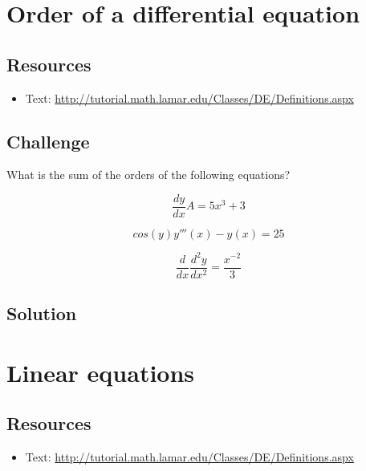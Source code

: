 \section{Order of a differential equation}

\subsection*{Resources}
\begin{itemize}
    \item Text: \url{http://tutorial.math.lamar.edu/Classes/DE/Definitions.aspx}
\end{itemize}

\subsection*{Challenge}
What is the sum of the orders of the following equations?

\begin{equation}
    \frac{dy}{dx}A = 5x^3 + 3
\end{equation}

\begin{equation}
    cos(y) y'''(x) - y(x) = 25
\end{equation}

\begin{equation}
    \frac{d}{dx} \frac{d^2 y}{dx^2} = \frac{x^{-2}}{3}
\end{equation}

\subsection*{Solution}
\six{}




\newpage

\section{Linear equations}

\subsection*{Resources}
\begin{itemize}
    \item Text: \url{http://tutorial.math.lamar.edu/Classes/DE/Definitions.aspx}
\end{itemize}

